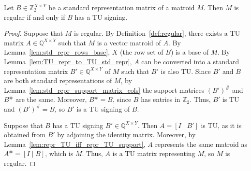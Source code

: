 \begin{lemma}
    \label{lem:regular_defs_equiv}
    \leanok
    Let $B \in \mathbb{Z}_{2}^{X \times Y}$ be a standard representation matrix of a matroid $M$. Then $M$ is regular if and only if $B$ has a TU signing.
\end{lemma}

\begin{proof}
    \leanok
    Suppose that $M$ is regular. By Definition~\ref{def:regular}, there exists a TU matrix $A \in \mathbb{Q}^{X \times Y}$ such that $M$ is a vector matroid of $A$. By Lemma~\ref{lem:std_repr_rows_base}, $X$ (the row set of $B$) is a base of $M$. By Lemma~\ref{lem:TU_repr_to_TU_std_repr}, $A$ can be converted into a standard representation matrix $B' \in \mathbb{Q}^{X \times Y}$ of $M$ such that $B'$ is also TU. Since $B'$ and $B$ are both standard representations of $M$, by Lemma~\ref{lem:std_repr_support_matrix_cols} the support matrices $(B')^{\#}$ and $B^{\#}$ are the same. Moreover, $B^{\#} = B$, since $B$ has entries in $\mathbb{Z}_{2}$. Thus, $B'$ is TU and $(B')^{\#} = B$, so $B'$ is a TU signing of $B$.

    Suppose that $B$ has a TU signing $B' \in \mathbb{Q}^{X \times Y}$. Then $A = [I \mid B']$ is TU, as it is obtained from $B'$ by adjoining the identity matrix. Moreover, by Lemma~\ref{lem:repr_TU_iff_repr_TU_support}, $A$ represents the same matroid as $A^{\#} = [I \mid B]$, which is $M$. Thus, $A$ is a TU matrix representing $M$, so $M$ is regular.
\end{proof}
